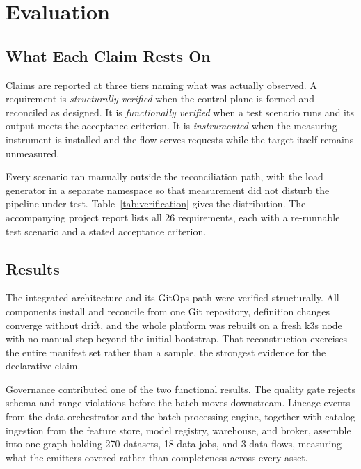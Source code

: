 
\section{Evaluation}
\label{sec:evaluation}



\subsection{What Each Claim Rests On}
\label{subsec:tiers}

Claims are reported at three tiers naming what was actually observed. A requirement is \emph{structurally verified} when the control plane is formed and reconciled as designed. It is \emph{functionally verified} when a test scenario runs and its output meets the acceptance criterion. It is \emph{instrumented} when the measuring instrument is installed and the flow serves requests while the target itself remains unmeasured.

Every scenario ran manually outside the reconciliation path, with the load generator in a separate namespace so that measurement did not disturb the pipeline under test. Table~\ref{tab:verification} gives the distribution. The accompanying project report lists all 26 requirements, each with a re-runnable test scenario and a stated acceptance criterion.

\subsection{Results}
\label{subsec:results}

The integrated architecture and its GitOps path were verified structurally. All components install and reconcile from one Git repository, definition changes converge without drift, and the whole platform was rebuilt on a fresh k3s node with no manual step beyond the initial bootstrap. That reconstruction exercises the entire manifest set rather than a sample, the strongest evidence for the declarative claim.

Governance contributed one of the two functional results. The quality gate rejects schema and range violations before the batch moves downstream. Lineage events from the data orchestrator and the batch processing engine, together with catalog ingestion from the feature store, model registry, warehouse, and broker, assemble into one graph holding 270 datasets, 18 data jobs, and 3 data flows, measuring what the emitters covered rather than completeness across every asset.


